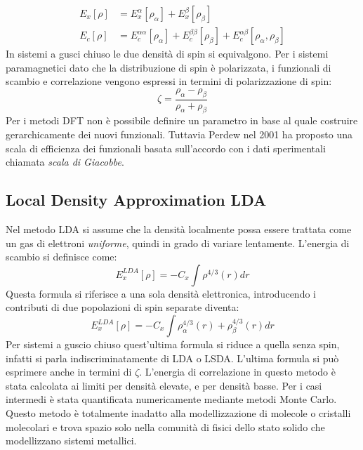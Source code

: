 \documentclass[oneside]{amsbook}
\numberwithin{section}{chapter}
\numberwithin{equation}{section}
\numberwithin{figure}{section}
\begin{document}
\begin{equation}
\begin{aligned}
E_{x}[\rho]&= E_{x}^\alpha[\rho_\alpha] + E_{x}^\beta[\rho_\beta]\\
E_{c}[\rho] &= E_{c}^{\alpha\alpha}[\rho_\alpha] + E_{c}^{\beta\beta}[\rho_\beta] + E_{c}^{\alpha\beta}[\rho_{\alpha},\rho_\beta ]
\end{aligned}
\end{equation}
In sistemi a gusci chiuso le due densità di spin si equivalgono. Per i sistemi paramagnetici dato che la distribuzione di spin è polarizzata, i funzionali di scambio e correlazione vengono espressi in termini di polarizzazione di spin:
\begin{equation}
\zeta=\frac{\rho_{\alpha}-\rho_{\beta}}{\rho_{\alpha}+\rho_{\beta}}
\end{equation}
Per i metodi DFT non è possibile definire un parametro in base al quale costruire gerarchicamente dei nuovi funzionali. Tuttavia Perdew nel 2001 ha proposto una scala di efficienza dei funzionali basata sull'accordo con i dati sperimentali chiamata \emph{scala di Giacobbe}.
\subsection{Local Density Approximation LDA }
Nel metodo LDA  si assume che la densità localmente possa essere trattata come un gas di elettroni \emph{uniforme}, quindi in grado di variare lentamente.
L'energia di scambio si definisce come:
\begin{equation}
E_x^{LDA} [\rho] = -C_x \int \rho ^{4/3}(r) dr
\end{equation}
Questa formula si riferisce a una sola densità elettronica, introducendo i contributi di due popolazioni di spin separate diventa:
\begin{equation}
E_x^{LDA} [\rho] = -C_x \int \rho_\alpha ^{4/3}(r)+\rho_\beta ^{4/3}(r) dr
\end{equation}
Per sistemi  a guscio chiuso quest'ultima formula si riduce a quella senza spin, infatti si parla indiscriminatamente di LDA o LSDA.
L'ultima formula si può esprimere anche in termini di $\zeta$.
L'energia di correlazione in questo metodo è stata calcolata ai limiti per densità elevate, e per densità basse. Per i casi intermedi è stata quantificata numericamente mediante metodi Monte Carlo.
Questo metodo è totalmente inadatto alla modellizzazione di molecole o cristalli molecolari e trova spazio solo nella comunità di fisici dello stato solido che modellizzano sistemi metallici.
\end{document}
